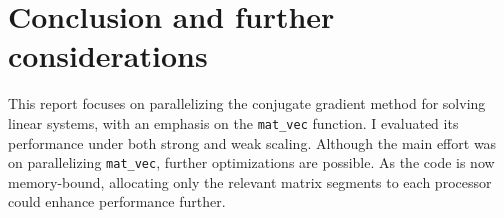 \documentclass{article}
\begin{document}
\section{Conclusion and further considerations}
This report focuses on parallelizing the conjugate gradient method for solving linear systems, with an emphasis on the \verb|mat_vec| function. I evaluated its performance under both strong and weak scaling. Although the main effort was on parallelizing \verb|mat_vec|, further optimizations are possible. As the code is now memory-bound, allocating only the relevant matrix segments to each processor could enhance performance further.





\end{document}
